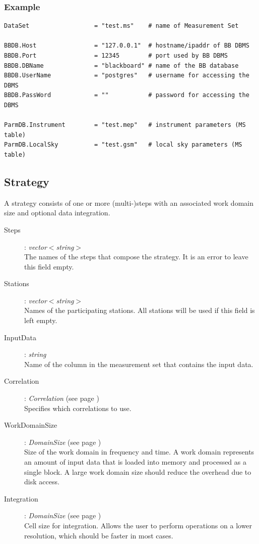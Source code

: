 \documentclass[10pt]{lofar}
\begin{document}
\subsubsection*{Example}
{\footnotesize
\begin{verbatim}
DataSet                  = "test.ms"    # name of Measurement Set

BBDB.Host                = "127.0.0.1"  # hostname/ipaddr of BB DBMS
BBDB.Port                = 12345        # port used by BB DBMS
BBDB.DBName              = "blackboard" # name of the BB database
BBDB.UserName            = "postgres"   # username for accessing the DBMS
BBDB.PassWord            = ""           # password for accessing the DBMS

ParmDB.Instrument        = "test.mep"   # instrument parameters (MS table)
ParmDB.LocalSky          = "test.gsm"   # local sky parameters (MS table)
\end{verbatim}
}

\subsection*{Strategy}
A strategy consists of one or more (multi-)steps with an associated work domain
size and optional data integration.
\begin{description}
\item [Steps] : \emph{vector$<$string$>$} \\
    The names of the steps that compose the strategy. It is an error to leave
    this field empty.
\item [Stations] : \emph{vector$<$string$>$} \\
    Names of the participating stations. All stations will be used if this
    field is left empty.
\item [InputData] : \emph{string} \\
    Name of the column in the measurement set that contains the input data.
\item [Correlation] : \emph{Correlation} (see page \pageref{app-correlation}) \\
    Specifies which correlations to use.
\item [WorkDomainSize] : \emph{DomainSize} (see page \pageref{app-domainsize}) \\
    Size of the work domain in frequency and time. A work domain represents an
    amount of input data that is loaded into memory and processed as a single
    block.  A large work domain size should reduce the overhead due to disk
    access.
\item [Integration] : \emph{DomainSize} (see page \pageref{app-domainsize}) \\
    Cell size for integration. Allows the user to perform operations on a
    lower resolution, which should be faster in most cases.
\end{description}
\end{document}
